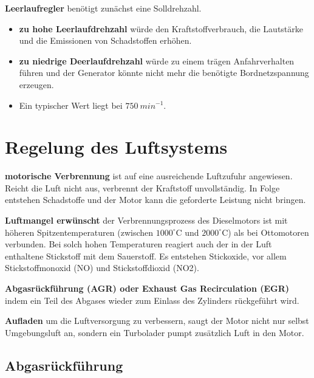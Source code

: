 \textbf{Leerlaufregler} benötigt zunächst eine Solldrehzahl.

\begin{itemize}
\item
  \textbf{zu hohe Leerlaufdrehzahl} würde den Kraftstoffverbrauch, die
  Lautstärke und die Emissionen von Schadstoffen erhöhen.
\item
  \textbf{zu niedrige Deerlaufdrehzahl} würde zu einem trägen
  Anfahrverhalten führen und der Generator könnte nicht mehr die
  benötigte Bordnetzspannung erzeugen.
\item
  Ein typischer Wert liegt bei $750~min^{-1}$.
\end{itemize}

\newpage

\section{Regelung des Luftsystems}\label{regelung-des-luftsystems}

\textbf{motorische Verbrennung} ist auf eine ausreichende Luftzufuhr
angewiesen. Reicht die Luft nicht aus, verbrennt der Kraftstoff
unvollständig. In Folge entstehen Schadstoffe und der Motor kann die
geforderte Leistung nicht bringen.

\textbf{Luftmangel erwünscht} der Verbrennungsprozess des Dieselmotors
ist mit höheren Spitzentemperaturen (zwischen $1000^\circ \text{C}$
und $2000^\circ \text{C}$) als bei Ottomotoren verbunden. Bei solch
hohen Temperaturen reagiert auch der in der Luft enthaltene Stickstoff
mit dem Sauerstoff. Es entstehen Stickoxide, vor allem Stickstoffmonoxid
(NO) und Stickstoffdioxid (NO2).

\textbf{Abgasrückführung (AGR) oder Exhaust Gas Recirculation (EGR)}
indem ein Teil des Abgases wieder zum Einlass des Zylinders rückgeführt
wird.

\textbf{Aufladen} um die Luftversorgung zu verbessern, saugt der Motor
nicht nur selbst Umgebungsluft an, sondern ein Turbolader pumpt
zusätzlich Luft in den Motor.

\newpage

\subsection{Abgasrückführung}\label{abgasrueckfuehrung}

